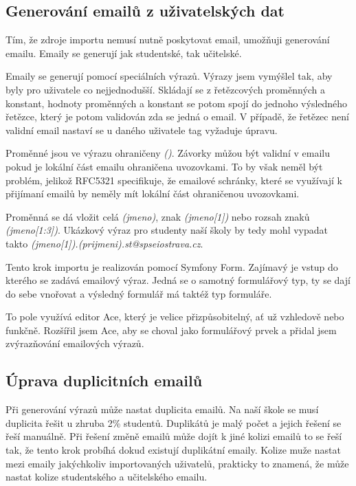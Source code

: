 \subsection{Generování emailů z uživatelských dat}

Tím, že zdroje importu nemusí nutně poskytovat email, umožňuji generování emailu.
Emaily se generují jak studentské, tak učitelské.

Emaily se generují pomocí speciálních výrazů.
Výrazy jsem vymýšlel tak, aby byly pro uživatele co nejjednodušší.
Skládají se z řetězcových proměnných a konstant, hodnoty proměnných a konstant se potom spojí do jednoho výsledného řetězce, který je potom validován zda se jedná o email. V případě, že řetězec není validní email nastaví se u daného uživatele tag vyžaduje úpravu. 

Proměnné jsou ve výrazu ohraničeny \textit{()}. Závorky můžou být validní v emailu pokud je lokální část emailu ohraničena uvozovkami\cite{wiki-email-address}. To by však neměl být problém, jelikož RFC5321 specifikuje, že emailové schránky, které se využívají k přijímaní  emailů by neměly mít lokální část ohraničenou uvozovkami\cite{rfc5321}.

Proměnná se dá vložit celá \textit{(jmeno)}, znak \textit{(jmeno[1])} nebo rozsah znaků \textit{(jmeno[1:3])}.
Ukázkový výraz pro studenty naší školy by tedy mohl vypadat takto \textit{(jmeno[1]).(prijmeni).st@spseiostrava.cz}.

Tento krok importu je realizován pomocí Symfony Form. Zajímavý je vstup do kterého se zadává emailový výraz. Jedná se o samotný formulářový typ, ty se dají do sebe vnořovat a výsledný formulář má taktéž typ formuláře. 

To pole využívá editor Ace, který je velice přizpůsobitelný, ať už vzhledově nebo funkčně. Rozšířil jsem Ace, aby se choval jako formulářový prvek a přidal jsem zvýrazňování emailových výrazů.

\subsection{Úprava duplicitních emailů}\label{postup:deduplikace-emailu}

Při generování výrazů může nastat duplicita emailů.
Na naší škole se musí duplicita řešit u zhruba 2\% studentů.
Duplikátů je malý počet a jejich řešení se řeší manuálně.
Při řešení změně emailů může dojít k jiné kolizi emailů to se řeší tak, že tento krok probíhá dokud existují duplikátní emaily. Kolize muže nastat mezi emaily jakýchkoliv importovaných uživatelů, prakticky to znamená, že může nastat kolize studentského a učitelského emailu.

